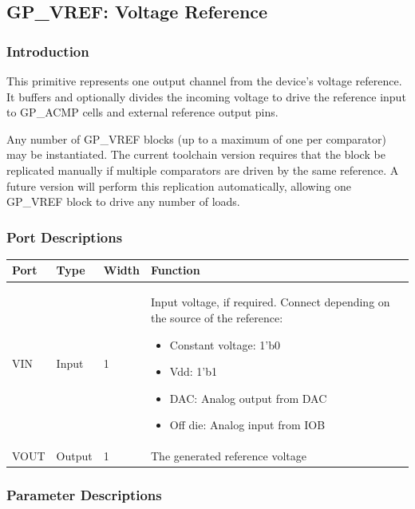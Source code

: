 \documentclass{article}
\begin{document}

\pagebreak
\subsection{GP\_VREF: Voltage Reference}

\subsubsection{Introduction}
This primitive represents one output channel from the device's voltage reference. It buffers and optionally divides the 
incoming voltage to drive the reference input to GP\_ACMP cells and external reference output pins.

Any number of GP\_VREF blocks (up to a maximum of one per comparator) may be instantiated. The current toolchain 
version requires that the block be replicated manually if multiple comparators are driven by the same reference. A 
future version will perform this replication automatically, allowing one GP\_VREF block to drive any number of loads.

\subsubsection{Port Descriptions}

\begin{tabularx}{5in}{|l|l|l|X|}
\hline
{\bfseries Port} & {\bfseries Type} & {\bfseries Width} & {\bfseries Function} \\
\hline
VIN & Input & 1 & Input voltage, if required. Connect depending on the source of the reference:
	\begin{itemize}
		\item Constant voltage: 1'b0
		\item Vdd: 1'b1
		\item DAC: Analog output from DAC
		\item Off die: Analog input from IOB
	\end{itemize}
\\
\hline
VOUT & Output & 1 & The generated reference voltage \\
\hline
\end{tabularx}

\subsubsection{Parameter Descriptions}
\end{document}
